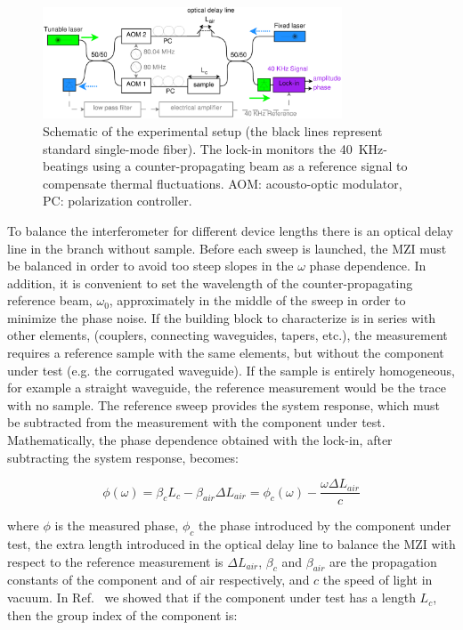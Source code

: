 \documentclass[journal]{IEEEtran}
\begin{document}
\begin{figure}[htb]
	\centering
	\includegraphics[width=3.5in]{dispersion6}
	\caption{Schematic of the experimental setup (the black lines represent standard single-mode fiber).
	The lock-in monitors the 40~KHz-beatings using a counter-propagating beam as a reference signal to compensate thermal fluctuations.
	AOM: acousto-optic modulator, PC: polarization controller. }
	\label{fig:dispersionSetup}
\end{figure}

To balance the interferometer for different device lengths there is an optical delay line in the branch without sample.
Before each sweep is launched, the MZI must be balanced in order to avoid too steep slopes in the $\omega$ phase dependence.
In addition, it is convenient to set the wavelength of the counter-propagating reference beam, $\omega_0$, approximately in the middle of the sweep in order to minimize the phase noise.
If the building block to characterize is in series with other elements, (couplers, connecting waveguides, tapers, etc.), the measurement requires a reference sample with the same elements, but without the component under test (e.g. the corrugated waveguide). If the sample is entirely homogeneous, for example a straight waveguide, the reference measurement would be the trace with no sample.
The reference sweep provides the system response, which must be subtracted from the measurement with the component under test. 
Mathematically, the phase dependence obtained with the lock-in, after subtracting the system response, becomes:


\begin{equation}
  \phi(\omega)= \beta_c L_c - \beta_{air} \Delta L_{air} =\phi_{c}(\omega)-\frac{\omega\Delta L_{air}}{c}
  \label{eq:response}
\end{equation}

where $\phi$ is the measured phase, $\phi_{c}$ the phase introduced by the component under test, the extra length introduced in the optical delay line to balance the MZI with respect to the reference measurement is $\Delta L_{air}$, $\beta_c$ and $\beta_{air}$ are the propagation constants of the component and of air respectively, and $c$ the speed of light in vacuum.
In Ref.~\cite{Mas2012} we showed that if the component under test has a length $L_{c}$, then the group index of the component is:
\end{document}
